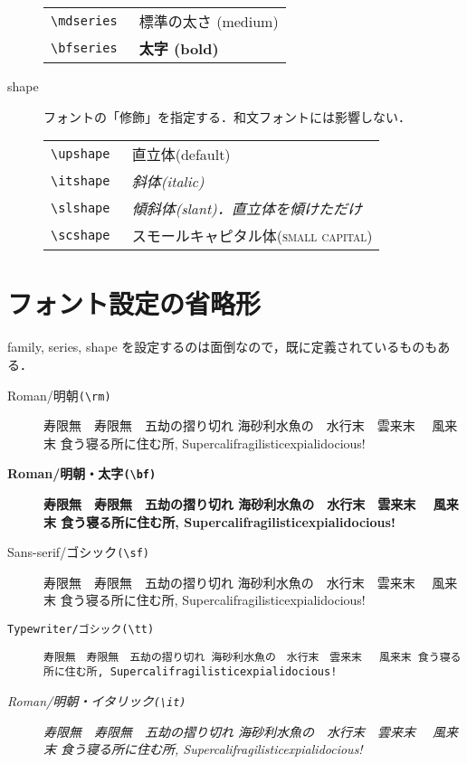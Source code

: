 \documentclass[12pt,a4paper]{ltjsarticle}
\newcommand{\jugem}{寿限無　寿限無　五劫の摺り切れ 海砂利水魚の　水行末　雲来末　
  風来末 食う寝る所に住む所, Supercalifragilisticexpialidocious!}
\begin{document}
\begin{description}
\begin{table}[h]
\begin{tabular}{rl}
      \tt{\textbackslash{}mdseries} & {\mdseries 標準の太さ (medium)}\\
      \tt{\textbackslash{}bfseries} & {\bfseries 太字 (bold)}\\
      \hline
    \end{tabular}
  \end{table}
\item[shape] フォントの「修飾」を指定する．和文フォントには影響しない．
  \begin{table}[h]
    \centering
    \begin{tabular}{rl}
      \hline
      \tt{\textbackslash{}upshape} & {\upshape 直立体(default)}\\
      \tt{\textbackslash{}itshape} & {\itshape 斜体(italic)}\\
      \tt{\textbackslash{}slshape} & {\slshape 傾斜体(slant)．直立体を傾けただけ}\\
      \tt{\textbackslash{}scshape} & {\scshape スモールキャピタル体(small
        capital)}\\
      \hline
    \end{tabular}
  \end{table}
\end{description}
\section{フォント設定の省略形}
family, series, shape を設定するのは面倒なので，既に定義されているものもある．
\begin{description}
\item [\rm Roman/明朝\tt{(\textbackslash{}rm)}] {\rm \jugem}
\item [\bf Roman/明朝・太字\tt{(\textbackslash{}bf)}] {\bf \jugem}
\item [\sf Sans-serif/ゴシック\tt{(\textbackslash{}sf)}] {\sf \jugem}
\item [\tt Typewriter/ゴシック\tt{(\textbackslash{}tt)}] {\tt \jugem}
\item [\it Roman/明朝・イタリック\tt{(\textbackslash{}it)}] {\it \jugem}
\end{description}
\end{document}
